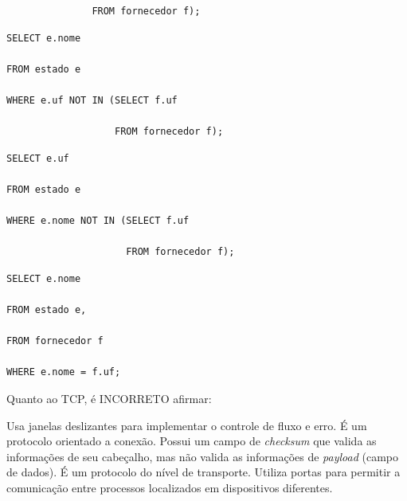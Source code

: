 \documentclass[12pt, addpoints]{exam}
\begin{document}
\begin{questions}
\begin{choices}
\begin{verbatim}
               FROM fornecedor f);

\end{verbatim}


\choice \begin{verbatim}SELECT e.nome

FROM estado e

WHERE e.uf NOT IN (SELECT f.uf

                   FROM fornecedor f);

\end{verbatim}


\choice \begin{verbatim}SELECT e.uf

FROM estado e

WHERE e.nome NOT IN (SELECT f.uf

                     FROM fornecedor f);

\end{verbatim}
\choice \begin{verbatim}SELECT e.nome

FROM estado e,

FROM fornecedor f

WHERE e.nome = f.uf;

\end{verbatim}


\end{choices}

\question

Quanto ao TCP, é INCORRETO afirmar:
\begin{choices}
\choice Usa janelas deslizantes para implementar o controle de fluxo e erro.
\choice É um protocolo orientado a conexão.
\choice Possui um campo de \textit{checksum} que valida as informações de seu cabeçalho, mas não valida as informações de \textit{payload} (campo de dados).
\choice É um protocolo do nível de transporte.
\choice Utiliza portas para permitir a comunicação entre processos localizados em dispositivos diferentes.
\end{choices}



    \end{questions}
    
\end{document}
